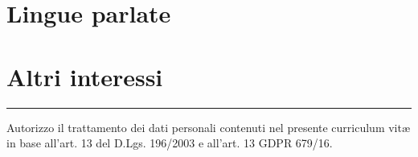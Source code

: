 \documentclass[11pt,a4paper,roman]{moderncv}
\begin{document}
\section{Lingue parlate}

\section{Altri interessi}
\renewcommand{\listitemsymbol}{-~}

\vspace*{\fill}
\rule[1ex]{\textwidth}{0.5pt}
Autorizzo il trattamento dei dati personali contenuti nel presente curriculum vitæ in base all'art. 13 del D.Lgs. 196/2003 e all'art. 13 GDPR 679/16.
\end{document}

